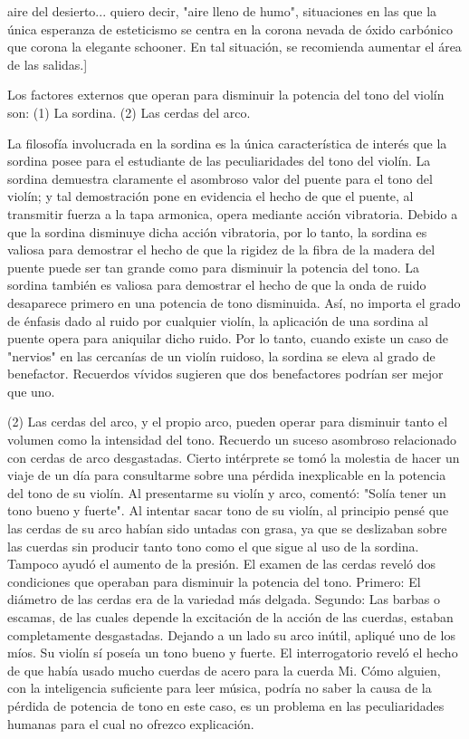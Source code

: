 \documentclass[12pt]{book}
\begin{document}
aire del desierto... quiero decir, "aire lleno de humo", situaciones en las que la única esperanza de esteticismo se centra en la corona nevada de óxido carbónico que corona la elegante schooner. En tal situación, se recomienda aumentar el área de las salidas.]

Los factores externos que operan para disminuir la potencia del tono del violín son: (1) La sordina. (2) Las cerdas del arco.

La filosofía involucrada en la sordina es la única característica de interés que la sordina posee para el estudiante de las peculiaridades del tono del violín. La sordina demuestra claramente el asombroso valor del puente para el tono del violín; y tal demostración pone en evidencia el hecho de que el puente, al transmitir fuerza a la tapa armonica, opera mediante acción vibratoria. Debido a que la sordina disminuye dicha acción vibratoria, por lo tanto, la sordina es valiosa para demostrar el hecho de que la rigidez de la fibra de la madera del puente puede ser tan grande como para disminuir la potencia del tono. La sordina también es valiosa para demostrar el hecho de que la onda de ruido desaparece primero en una potencia de tono disminuida. Así, no importa el grado de énfasis dado al ruido por cualquier violín, la aplicación de una sordina al puente opera para aniquilar dicho ruido. Por lo tanto, cuando existe un caso de "nervios" en las cercanías de un violín ruidoso, la sordina se eleva al grado de benefactor. Recuerdos vívidos sugieren que dos benefactores podrían ser mejor que uno.

(2) Las cerdas del arco, y el propio arco, pueden operar para disminuir tanto el volumen como la intensidad del tono. Recuerdo un suceso asombroso relacionado con cerdas de arco desgastadas. Cierto intérprete se tomó la molestia de hacer un viaje de un día para consultarme sobre una pérdida inexplicable en la potencia del tono de su violín. Al presentarme su violín y arco, comentó: "Solía tener un tono bueno y fuerte". Al intentar sacar tono de su violín, al principio pensé que las cerdas de su arco habían sido untadas con grasa, ya que se deslizaban sobre las cuerdas sin producir tanto tono como el que sigue al uso de la sordina. Tampoco ayudó el aumento de la presión. El examen de las cerdas reveló dos condiciones que operaban para disminuir la potencia del tono. Primero: El diámetro de las cerdas era de la variedad más delgada. Segundo: Las barbas o escamas, de las cuales depende la excitación de la acción de las cuerdas, estaban completamente desgastadas. Dejando a un lado su arco inútil, apliqué uno de los míos. Su violín sí poseía un tono bueno y fuerte. El interrogatorio reveló el hecho de que había usado mucho cuerdas de acero para la cuerda Mi. Cómo alguien, con la inteligencia suficiente para leer música, podría no saber la causa de la pérdida de potencia de tono en este caso, es un problema en las peculiaridades humanas para el cual no ofrezco explicación.
\end{document}
